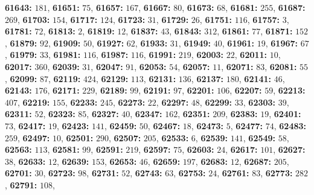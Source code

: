 \textsf{\bfseries 61643:} $181$, \textsf{\bfseries 61651:} $75$, \textsf{\bfseries 61657:} $167$, \textsf{\bfseries 61667:} $80$, \textsf{\bfseries 61673:} $68$, \textsf{\bfseries 61681:} $255$, \textsf{\bfseries 61687:} $269$, \textsf{\bfseries 61703:} $154$, \textsf{\bfseries 61717:} $124$, \textsf{\bfseries 61723:} $31$, \textsf{\bfseries 61729:} $26$, \textsf{\bfseries 61751:} $116$, \textsf{\bfseries 61757:} $3$, \textsf{\bfseries 61781:} $72$, \textsf{\bfseries 61813:} $2$, \textsf{\bfseries 61819:} $12$, \textsf{\bfseries 61837:} $43$, \textsf{\bfseries 61843:} $312$, \textsf{\bfseries 61861:} $77$, \textsf{\bfseries 61871:} $152$, \textsf{\bfseries 61879:} $92$, \textsf{\bfseries 61909:} $50$, \textsf{\bfseries 61927:} $62$, \textsf{\bfseries 61933:} $31$, \textsf{\bfseries 61949:} $40$, \textsf{\bfseries 61961:} $19$, \textsf{\bfseries 61967:} $67$, \textsf{\bfseries 61979:} $33$, \textsf{\bfseries 61981:} $116$, \textsf{\bfseries 61987:} $116$, \textsf{\bfseries 61991:} $219$, \textsf{\bfseries 62003:} $22$, \textsf{\bfseries 62011:} $10$, \textsf{\bfseries 62017:} $360$, \textsf{\bfseries 62039:} $31$, \textsf{\bfseries 62047:} $91$, \textsf{\bfseries 62053:} $54$, \textsf{\bfseries 62057:} $11$, \textsf{\bfseries 62071:} $83$, \textsf{\bfseries 62081:} $55$, \textsf{\bfseries 62099:} $87$, \textsf{\bfseries 62119:} $424$, \textsf{\bfseries 62129:} $113$, \textsf{\bfseries 62131:} $136$, \textsf{\bfseries 62137:} $180$, \textsf{\bfseries 62141:} $46$, \textsf{\bfseries 62143:} $176$, \textsf{\bfseries 62171:} $229$, \textsf{\bfseries 62189:} $99$, \textsf{\bfseries 62191:} $97$, \textsf{\bfseries 62201:} $106$, \textsf{\bfseries 62207:} $59$, \textsf{\bfseries 62213:} $407$, \textsf{\bfseries 62219:} $155$, \textsf{\bfseries 62233:} $245$, \textsf{\bfseries 62273:} $22$, \textsf{\bfseries 62297:} $48$, \textsf{\bfseries 62299:} $33$, \textsf{\bfseries 62303:} $39$, \textsf{\bfseries 62311:} $52$, \textsf{\bfseries 62323:} $85$, \textsf{\bfseries 62327:} $40$, \textsf{\bfseries 62347:} $162$, \textsf{\bfseries 62351:} $209$, \textsf{\bfseries 62383:} $19$, \textsf{\bfseries 62401:} $73$, \textsf{\bfseries 62417:} $19$, \textsf{\bfseries 62423:} $141$, \textsf{\bfseries 62459:} $50$, \textsf{\bfseries 62467:} $18$, \textsf{\bfseries 62473:} $5$, \textsf{\bfseries 62477:} $74$, \textsf{\bfseries 62483:} $259$, \textsf{\bfseries 62497:} $10$, \textsf{\bfseries 62501:} $290$, \textsf{\bfseries 62507:} $205$, \textsf{\bfseries 62533:} $6$, \textsf{\bfseries 62539:} $141$, \textsf{\bfseries 62549:} $58$, \textsf{\bfseries 62563:} $113$, \textsf{\bfseries 62581:} $99$, \textsf{\bfseries 62591:} $219$, \textsf{\bfseries 62597:} $75$, \textsf{\bfseries 62603:} $24$, \textsf{\bfseries 62617:} $101$, \textsf{\bfseries 62627:} $38$, \textsf{\bfseries 62633:} $12$, \textsf{\bfseries 62639:} $153$, \textsf{\bfseries 62653:} $46$, \textsf{\bfseries 62659:} $197$, \textsf{\bfseries 62683:} $12$, \textsf{\bfseries 62687:} $205$, \textsf{\bfseries 62701:} $30$, \textsf{\bfseries 62723:} $98$, \textsf{\bfseries 62731:} $52$, \textsf{\bfseries 62743:} $63$, \textsf{\bfseries 62753:} $24$, \textsf{\bfseries 62761:} $83$, \textsf{\bfseries 62773:} $282$, \textsf{\bfseries 62791:} $108$, 
